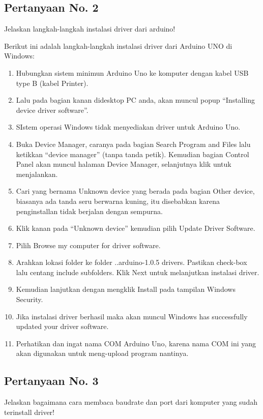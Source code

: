 \subsection{Pertanyaan No. 2}
Jelaskan langkah-langkah instalasi driver dari arduino!

\hfill \break
Berikut ini adalah langkah-langkah instalasi driver dari Arduino UNO di Windows:

\begin{enumerate}
	\item Hubungkan sistem minimun Arduino Uno ke komputer dengan kabel USB type B (kabel Printer).
	\item Lalu pada bagian kanan didesktop PC anda, akan muncul popup “Installing device driver software”.
	\item SIstem operasi Windows tidak menyediakan driver untuk Arduino Uno.
	\item Buka Device Manager, caranya pada bagian Search Program and Files lalu ketikkan “device manager” (tanpa tanda petik). Kemudian bagian Control Panel akan muncul halaman Device Manager, selanjutnya klik untuk menjalankan.
	\item Cari yang bernama Unknown device yang berada pada bagian Other device, biasanya ada tanda seru berwarna kuning, itu disebabkan karena penginstallan tidak berjalan dengan sempurna.
	\item Klik kanan pada “Unknown device” kemudian pilih Update Driver Software.
	\item Pilih Browse my computer for driver software.
	\item Arahkan lokasi folder ke folder ..arduino-1.0.5 drivers. Pastikan check-box lalu centang include subfolders. Klik Next untuk melanjutkan instalasi driver.
	\item Kemudian lanjutkan dengan mengklik Install pada tampilan Windows Security.
	\item Jika instalasi driver berhasil maka akan muncul Windows has successfully updated your driver software.
	\item Perhatikan dan ingat nama COM Arduino Uno, karena nama COM ini yang akan digunakan untuk meng-upload program nantinya.
\end{enumerate}

\subsection{Pertanyaan No. 3}
Jelaskan bagaimana cara membaca baudrate dan port dari komputer yang sudah terinstall driver!

